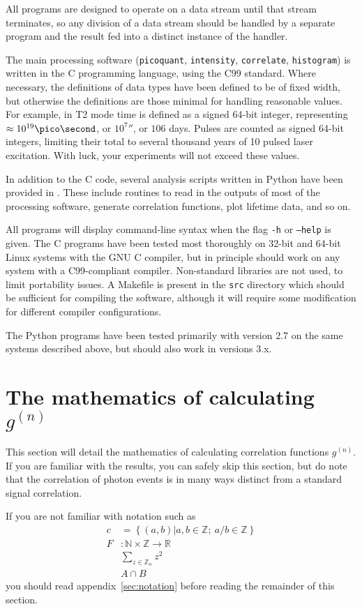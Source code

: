 \documentclass{article}
\newcommand{\braces}[1]{\ensuremath{\left\lbrace #1 \right\rbrace}}
\newcommand{\picoquant}{\texttt{picoquant}}
\newcommand{\intensity}{\texttt{intensity}}
\newcommand{\correlate}{\texttt{correlate}}
\newcommand{\histogram}{\texttt{histogram}}
\newcommand{\gn}[1]{\ensuremath{g^{(#1)}}}
\newcommand{\integers}{\ensuremath{\mathbb{Z}}}
\newcommand{\wholes}{\ensuremath{\mathbb{N}}}
\newcommand{\reals}{\ensuremath{\mathbb{R}}}
\begin{document}
All programs are designed to operate on a data stream until that stream terminates, so any division of a data stream should be handled by a separate program and the result fed into a distinct instance of the handler. 

The main processing software (\picoquant, \intensity, \correlate, \histogram) is written in the C programming language, using the C99 standard. Where necessary, the definitions of data types have been defined to be of fixed width, but otherwise the definitions are those minimal for handling reasonable values. For example, in T2 mode time is defined as a signed 64-bit integer, representing $\approx 10^{19}\pico\second$, or $10^{7}\second$, or $106$ days. Pulses are counted as signed 64-bit integers, limiting their total to several thousand years of 10\mega\hertz{} pulsed laser excitation. With luck, your experiments will not exceed these values. 

In addition to the C code, several analysis scripts written in Python have been provided in . These include routines to read in the outputs of most of the processing software, generate correlation functions, plot lifetime data, and so on. 

All programs will display command-line syntax when the flag \texttt{-h} or \texttt{--help} is given. The C programs have been tested most thoroughly on 32-bit and 64-bit Linux systems with the GNU C compiler, but in principle should work on any system with a C99-compliant compiler. Non-standard libraries are not used, to limit portability issues. A Makefile is present in the \texttt{src} directory which should be sufficient for compiling the software, although it will require some modification for different compiler configurations.

The Python programs have been tested primarily with version 2.7 on the same systems described above, but should also work in versions 3.x.

\section{The mathematics of calculating \gn{n}}
\label{sec:math_background}
This section will detail the mathematics of calculating correlation functions \gn{n}. If you are familiar with the results, you can safely skip this section, but do note that the correlation of photon events is in many ways distinct from a standard signal correlation.

If you are not familiar with notation such as
\begin{align}
c &= \braces{(a,b)|a,b\in\integers;~a/b\in\integers} \\
F&:\wholes\times\integers\rightarrow\reals \\
&\sum_{z\in\integers_{n}}{z^{2}} \\
&A\cap B
\end{align}
you should read appendix~\ref{sec:notation} before reading the remainder of this section.
\end{document}
